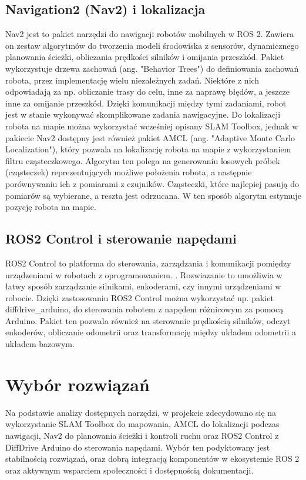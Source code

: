 \documentclass[a4paper,twoside,12pt]{book}
\begin{document}
\subsection{Navigation2 (Nav2) i lokalizacja}
Nav2 jest to pakiet narzędzi do nawigacji robotów mobilnych w ROS 2. Zawiera on zestaw algorytmów do tworzenia modeli środowiska z sensorów, dynamicznego planowania ścieżki, obliczania prędkości silników i omijania przeszkód. 
Pakiet wykorzystuje drzewa zachowań (ang. "Behavior Trees") do definiowania zachowań robota, przez implementację wielu niezależnych zadań. Niektóre z nich odpowiadają za np. obliczanie trasy do celu, inne za naprawę błędów, a jeszcze inne za omijanie przeszkód. Dzięki komunikacji między tymi zadaniami, robot jest w stanie wykonywać skomplikowane zadania nawigacyjne.
\cite{bib:abs-2003-00368}
\newline
\newline
Do lokalizacji robota na mapie można wykorzystać wcześniej opisany SLAM Toolbox, jednak w pakiecie Nav2 dostępny jest również pakiet AMCL (ang. "Adaptive Monte Carlo Localization")\cite{bib:amcl}, który pozwala na lokalizację robota na mapie z wykorzystaniem filtru cząsteczkowego. Algorytm ten polega na generowaniu losowych próbek (cząsteczek) reprezentujących możliwe położenia robota, a następnie porównywaniu ich z pomiarami z czujników. Cząsteczki, które najlepiej pasują do pomiarów są wybierane, a reszta jest odrzucana. W ten sposób algorytm estymuje pozycję robota na mapie. \cite{bib:amcl}
\subsection{ROS2 Control i sterowanie napędami}
ROS2 Control to platforma do sterowania, zarządzania i komunikacji pomiędzy urządzeniami w robotach z oprogramowaniem. \cite{bib:ros2control}. Rozwiazanie to umożliwia w łatwy sposób zarządzanie silnikami, enkoderami, czy innymi urządzeniami w robocie. Dzięki zastosowaniu ROS2 Control można wykorzystać np. pakiet diffdrive\_arduino, do sterowania robotem z napędem różnicowym za pomocą Arduino. Pakiet ten pozwala również na sterowanie prędkością silników, odczyt enkoderów, obliczanie odometrii oraz transformację między układem odometrii a układem bazowym. \cite{bib:diffdrive}
 

\section{Wybór rozwiązań}
Na podstawie analizy dostępnych narzędzi, w projekcie zdecydowano się na wykorzystanie SLAM Toolbox do mapowania, AMCL do lokalizacji podczas nawigacji, Nav2 do planowania ścieżki i kontroli ruchu oraz ROS2 Control z DiffDrive Arduino do sterowania napędami. Wybór ten podyktowany jest stabilnością rozwiązań, oraz dobrą integracją komponentów w ekosystemie ROS 2 oraz aktywnym wsparciem społeczności i dostępnością dokumentacji.
\end{document}

